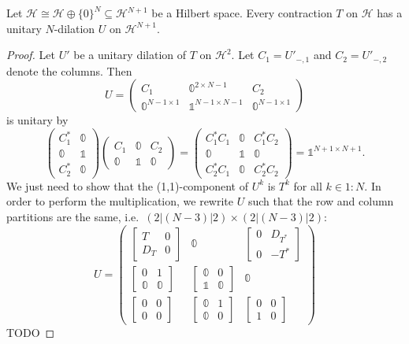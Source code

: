 \begin{proposition}
Let $\mathcal{H} \cong \mathcal{H}\oplus \{0\}^N \subseteq \mathcal{H}^{N+1}$ be a Hilbert space. Every contraction $T$ on $\mathcal{H}$ has a unitary $N$-dilation $U$ on $\mathcal{H}^{N+1}$.
\end{proposition}
\begin{proof}
Let $U'$ be a unitary dilation of $T$ on $\mathcal{H}^2$. Let $C_1 = U'_{-,1}$ and $C_2 = U'_{-,2}$ denote the columns. Then
\[ U = \begin{pmatrix}
C_1 & \mathbb{0}^{2\times N-1} & C_2 \\
\mathbb{0}^{N-1\times 1} & \mathbb{1}^{N-1\times N-1} & \mathbb{0}^{N-1\times 1}
\end{pmatrix} \]
is unitary by
\[ \begin{pmatrix}
C_1^* & \mathbb{0} \\
\mathbb{0} & \mathbb{1} \\
C_2^* & \mathbb{0}
\end{pmatrix}\begin{pmatrix}
C_1 & \mathbb{0} & C_2 \\
\mathbb{0} & \mathbb{1} & \mathbb{0}
\end{pmatrix} = \begin{pmatrix}
C_1^*C_1 & \mathbb{0} & C_1^*C_2 \\
\mathbb{0} & \mathbb{1} & \mathbb{0} \\
C_2^*C_1 & \mathbb{0} & C_2^*C_2
\end{pmatrix} = \mathbb{1}^{N+1\times N+1}. \]
We just need to show that the (1,1)-component of $U^k$ is $T^k$ for all $k\in 1:N$. In order to perform the multiplication, we rewrite $U$ such that the row and column partitions are the same, i.e.\ $(2|(N-3)|2)\times (2|(N-3)|2)$:
\[ U = \begin{pmatrix}
\begin{bmatrix}
T & 0 \\ D_T & 0
\end{bmatrix} & \mathbb{0} & \begin{bmatrix}
0 & D_{T^*} \\ 0 & -T^*
\end{bmatrix} \\
\begin{bmatrix}
0 & 1 \\ \mathbb{0} & \mathbb{0}
\end{bmatrix} & \begin{bmatrix}
\mathbb{0} & 0 \\ \mathbb{1} & \mathbb{0}
\end{bmatrix} & \mathbb{0} \\
\begin{bmatrix}
0 & 0 \\ 0 & 0
\end{bmatrix} & \begin{bmatrix}
\mathbb{0} & 1 \\ \mathbb{0} & 0
\end{bmatrix} & \begin{bmatrix}
0 & 0 \\ 1 & 0
\end{bmatrix}
\end{pmatrix} \]
TODO
\end{proof}

